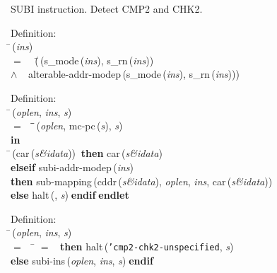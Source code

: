  SUBI instruction. Detect CMP2 and CHK2.
\begin{tabbing}{\sc Definition}: \\  
\=\,({\it{ins\/}}) \\ 
$=$$\;\;\;\;$(\=\,({\rm{s\_mode}}\,({\it{ins\/}}), {\rm{s\_rn}}\,({\it{ins\/}})) \\ 
$\wedge$$\;\;\;\;${\rm{alterable-addr-modep}}\,({\rm{s\_mode}}\,({\it{ins\/}}), {\rm{s\_rn}}\,({\it{ins\/}})))\-\-
\end{tabbing}

\begin{tabbing}{\sc Definition}: \\  
\=\,({\it{oplen\/}}, {\it{ins\/}}, {\it{s\/}}) \\ 
$=$$\;\;\;\;$\=\=\,({\it{oplen\/}}, {\rm{mc-pc}}\,({\it{s\/}}), {\it{s\/}})\- \\ 
{\bf in} \\ 
\=\,({\rm{car}}\,({\it{s\&idata\/}}))$\;\;${\bf then }{\rm{car}}\,({\it{s\&idata\/}}) \\ 
{\bf elseif }{\rm{subi-addr-modep}}\,({\it{ins\/}}) \\ 
{\bf then }{\rm{sub-mapping}}\,({\rm{cddr}}\,({\it{s\&idata\/}}), {\it{oplen\/}}, {\it{ins\/}}, {\rm{car}}\,({\it{s\&idata\/}})) \\ 
{\bf else }{\rm{halt}}\,({}, {\it{s\/}})$\;${\bf  endif}\-$\;${\bf  endlet}\-\-
\end{tabbing}

\begin{tabbing}{\sc Definition}: \\  
\=\,({\it{oplen\/}}, {\it{ins\/}}, {\it{s\/}}) \\ 
$=$$\;\;\;\;$\= $=$ {}$\;\;${\bf then }{\rm{halt}}\,({\tt{'}}{\tt{cmp2-chk2-unspecified}}, {\it{s\/}}) \\ 
{\bf else }{\rm{subi-ins}}\,({\it{oplen\/}}, {\it{ins\/}}, {\it{s\/}})$\;${\bf  endif}\-\-
\end{tabbing}

